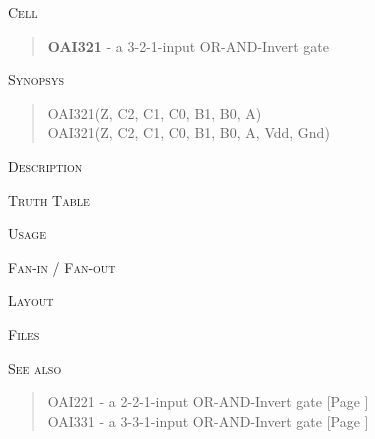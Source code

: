 
\label{OAI321}
\textsc{Cell}
\begin{quote}
    \textbf{OAI321} - a 3-2-1-input OR-AND-Invert gate
\end{quote}

\textsc{Synopsys}
\begin{quote}
    OAI321(Z, C2, C1, C0, B1, B0, A) \\
    OAI321(Z, C2, C1, C0, B1, B0, A, Vdd, Gnd)
\end{quote}

\textsc{Description}

%

\textsc{Truth Table}


\textsc{Usage}

\textsc{Fan-in / Fan-out}

\textsc{Layout}

\textsc{Files}

\textsc{See also}
\begin{quote}
    OAI221 - a 2-2-1-input OR-AND-Invert gate [Page \pageref{OAI221}] \\
    OAI331 - a 3-3-1-input OR-AND-Invert gate [Page \pageref{OAI331}]
\end{quote}
